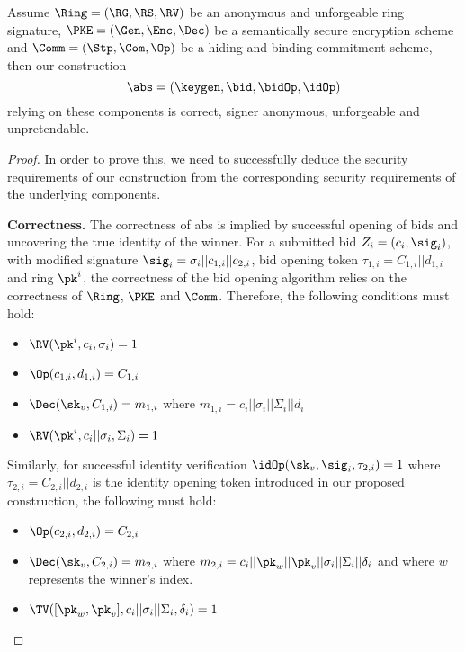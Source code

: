\begin{theorem} Assume $\Ring=(\RG, \RS, \RV)$ be an anonymous and unforgeable ring signature, $\PKE=(\Gen,\Enc, \Dec)$ be a semantically secure encryption scheme and $\Comm=(\Stp, \Com, \Op)$ be a hiding and binding commitment scheme, then our construction 
\begin{equation*}
    \abs=(\keygen,\bid,\bidOp,\idOp)
\end{equation*}
 relying on these components is correct, signer anonymous, unforgeable and unpretendable.
\end{theorem}
\begin{proof}
  In order to prove this, we need to successfully deduce the security requirements of our construction from the corresponding security requirements of the underlying components.
  \begin{description}
  \item \textbf{Correctness.} The correctness of \gls{abs} is implied by successful opening of bids and uncovering the true identity of the winner. For a submitted bid $Z_i=(c_i, \sig_i)$, with modified signature $\sig_i = \sigma_i || c_{1,i} || c_{2,i}$, bid opening token $\tau_{1,i} = C_{1,i} || d_{1,i}$ and ring $\pk^i$, the correctness of the bid opening algorithm relies on the correctness of $\Ring$, $\PKE$ and $\Comm$. Therefore, the following conditions must hold:
    \begin{itemize}
    \item $\RV(\pk^i, c_i, \sigma_i) = 1$
    \item $\Op(c_{1,i}, d_{1,i}) = C_{1,i}$ 
    \item $\Dec(\sk_v, C_{1,i}) = m_{1,i}$ where $m_{1,i} = c_i || \sigma_i || \Sigma_i || d_i$
    \item $\RV(\pk^i, c_i || \sigma_i, \Sigma_i) = 1$
    \end{itemize}
    Similarly, for successful identity verification $\idOp(\sk_v, \sig_i, \tau_{2,i})=1$ where $\tau_{2,i} = C_{2,i} || d_{2,i}$ is the identity opening token introduced in our proposed construction, the following must hold:
    \begin{itemize}
    \item $\Op(c_{2,i}, d_{2,i}) = C_{2,i}$
    \item $\Dec(\sk_v, C_{2,i}) = m_{2,i}$ where $m_{2,i} = c_i || \pk_w || \pk_v || \sigma_i || \Sigma_i || \delta_i$ and where $w$ represents the winner's index.
    \item $\TV([\pk_w, \pk_v], c_i || \sigma_i || \Sigma_i, \delta_i)=1$ 
    \end{itemize}
    

\end{description}
\end{proof}
